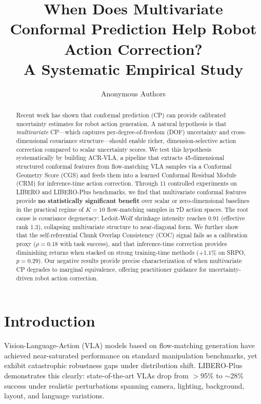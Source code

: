 \documentclass[letterpaper]{article}
\title{When Does Multivariate Conformal Prediction Help Robot Action Correction?\\A Systematic Empirical Study}
\author[1]{Anonymous Authors}
\affil[1]{Anonymous Institution}
\date{}
\begin{document}
\maketitle

\begin{abstract}
Recent work has shown that conformal prediction (CP) can provide calibrated uncertainty estimates for robot action generation.
A natural hypothesis is that \emph{multivariate} CP---which captures per-degree-of-freedom (DOF) uncertainty and cross-dimensional covariance structure---should enable richer, dimension-selective action correction compared to scalar uncertainty scores.
We test this hypothesis systematically by building ACR-VLA, a pipeline that extracts 45-dimensional structured conformal features from flow-matching VLA samples via a Conformal Geometry Score (CGS) and feeds them into a learned Conformal Residual Module (CRM) for inference-time action correction.
Through 11 controlled experiments on LIBERO and LIBERO-Plus benchmarks, we find that multivariate conformal features provide \textbf{no statistically significant benefit} over scalar or zero-dimensional baselines in the practical regime of $K{=}10$ flow-matching samples in 7D action spaces.
The root cause is covariance degeneracy: Ledoit-Wolf shrinkage intensity reaches 0.91 (effective rank 1.3), collapsing multivariate structure to near-diagonal form.
We further show that the self-referential Chunk Overlap Consistency (COC) signal fails as a calibration proxy ($\rho{=}0.18$ with task success), and that inference-time correction provides diminishing returns when stacked on strong training-time methods ($+1.1\%$ on SRPO, $p{=}0.29$).
Our negative results provide precise characterization of when multivariate CP degrades to marginal equivalence, offering practitioner guidance for uncertainty-driven robot action correction.
\end{abstract}

\section{Introduction}
\label{sec:intro}

Vision-Language-Action (VLA) models based on flow-matching generation have achieved near-saturated performance on standard manipulation benchmarks, yet exhibit catastrophic robustness gaps under distribution shift.
LIBERO-Plus demonstrates this clearly: state-of-the-art VLAs drop from $>$95\% to $\sim$28\% success under realistic perturbations spanning camera, lighting, background, layout, and language variations.
\end{document}
